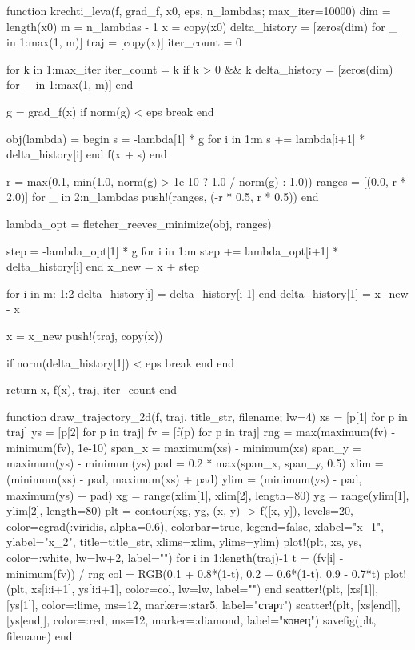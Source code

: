 \documentclass[a4paper, 14pt]{extarticle}
\begin{document}
\begin{breakablelisting}
function krechti_leva(f, grad_f, x0, eps, n_lambdas; max_iter=10000)
    dim = length(x0)
    m = n_lambdas - 1
    x = copy(x0)
    delta_history = [zeros(dim) for _ in 1:max(1, m)]
    traj = [copy(x)]
    iter_count = 0

    for k in 1:max_iter
        iter_count = k
        if k > 0 && k %
            delta_history = [zeros(dim) for _ in 1:max(1, m)]
        end

        g = grad_f(x)
        if norm(g) < eps
            break
        end

        obj(lambda) = begin
            s = -lambda[1] * g
            for i in 1:m
                s += lambda[i+1] * delta_history[i]
            end
            f(x + s)
        end

        r = max(0.1, min(1.0, norm(g) > 1e-10 ? 1.0 / norm(g) : 1.0))
        ranges = [(0.0, r * 2.0)]
        for _ in 2:n_lambdas
            push!(ranges, (-r * 0.5, r * 0.5))
        end

        lambda_opt = fletcher_reeves_minimize(obj, ranges)

        step = -lambda_opt[1] * g
        for i in 1:m
            step += lambda_opt[i+1] * delta_history[i]
        end
        x_new = x + step

        for i in m:-1:2
            delta_history[i] = delta_history[i-1]
        end
        delta_history[1] = x_new - x

        x = x_new
        push!(traj, copy(x))

        if norm(delta_history[1]) < eps
            break
        end
    end

    return x, f(x), traj, iter_count
end

function draw_trajectory_2d(f, traj, title_str, filename; lw=4)
    xs = [p[1] for p in traj]
    ys = [p[2] for p in traj]
    fv = [f(p) for p in traj]
    rng = max(maximum(fv) - minimum(fv), 1e-10)
    span_x = maximum(xs) - minimum(xs)
    span_y = maximum(ys) - minimum(ys)
    pad = 0.2 * max(span_x, span_y, 0.5)
    xlim = (minimum(xs) - pad, maximum(xs) + pad)
    ylim = (minimum(ys) - pad, maximum(ys) + pad)
    xg = range(xlim[1], xlim[2], length=80)
    yg = range(ylim[1], ylim[2], length=80)
    plt = contour(xg, yg, (x, y) -> f([x, y]), levels=20, color=cgrad(:viridis, alpha=0.6), colorbar=true, legend=false, xlabel="x_1", ylabel="x_2", title=title_str, xlims=xlim, ylims=ylim)
    plot!(plt, xs, ys, color=:white, lw=lw+2, label="")
    for i in 1:length(traj)-1
        t = (fv[i] - minimum(fv)) / rng
        col = RGB(0.1 + 0.8*(1-t), 0.2 + 0.6*(1-t), 0.9 - 0.7*t)
        plot!(plt, xs[i:i+1], ys[i:i+1], color=col, lw=lw, label="")
    end
    scatter!(plt, [xs[1]], [ys[1]], color=:lime, ms=12, marker=:star5, label="старт")
    scatter!(plt, [xs[end]], [ys[end]], color=:red, ms=12, marker=:diamond, label="конец")
    savefig(plt, filename)
end


\end{breakablelisting}
\end{document}
